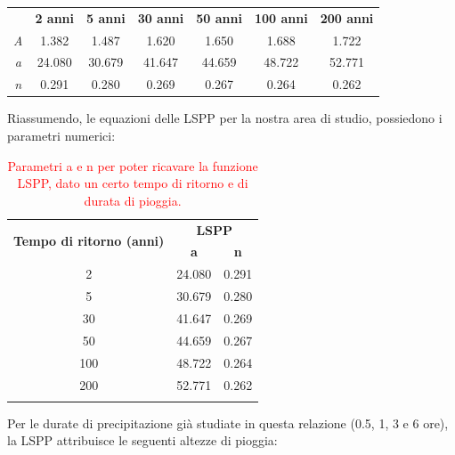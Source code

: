 \begin{table}[H] \centering
    \begin{tabular}{ccccccc}
    \toprule
 & \textbf{2 anni} & \textbf{5 anni} & \textbf{30 anni} & \textbf{50 anni} & \textbf{100 anni} & \textbf{200 anni} \\
    \textit{A} & 1.382  & 1.487  & 1.620  & 1.650  & 1.688  & 1.722  \\
    \textit{a} & 24.080 & 30.679 & 41.647 & 44.659 & 48.722 & 52.771 \\
    \textit{n} & 0.291  & 0.280  & 0.269  & 0.267  & 0.264  & 0.262  \\
    \bottomrule
    \end{tabular}
    \end{table}
Riassumendo, le equazioni delle LSPP per la nostra area di studio, possiedono i parametri numerici:

\begin{table}[H] \centering
    \caption{\textcolor{red}{Parametri a e n per poter ricavare la funzione LSPP, dato un certo tempo di ritorno e di durata di pioggia.}}
    \begin{tabular}{ccc}
    \toprule
    \multirow{2}{*}{\textbf{Tempo di ritorno (anni)}} & \multicolumn{2}{c}{\textbf{LSPP}} \\
     & \textbf{a}      & \textbf{n}      \\
    2                                                 & 24.080          & 0.291           \\
    5                                                 & 30.679          & 0.280           \\
    30                                                & 41.647          & 0.269           \\
    50                                                & 44.659          & 0.267           \\
    100                                               & 48.722          & 0.264           \\
    200                                               & 52.771          & 0.262   \\
    \bottomrule  
    \label{parametri_LSPP}     
    \end{tabular}
    \end{table}

Per le durate di precipitazione già studiate in questa relazione (0.5, 1, 3 e 6 ore), la LSPP attribuisce le seguenti altezze di pioggia:

